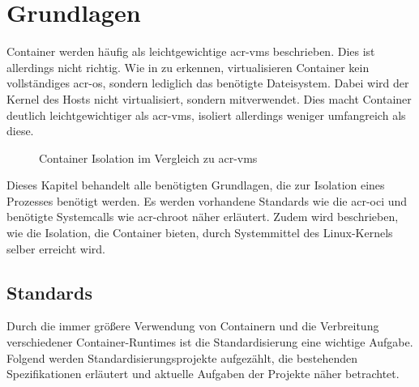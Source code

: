 \chapter{Grundlagen}
\label{chap:grundlagen}
Container werden häufig als leichtgewichtige \glspl{acr-vm} beschrieben. Dies ist allerdings nicht  richtig. Wie in  zu erkennen, virtualisieren Container kein vollständiges \gls{acr-os}, sondern lediglich das benötigte Dateisystem. Dabei wird der Kernel des Hosts nicht virtualisiert, sondern mitverwendet. Dies macht Container deutlich leichtgewichtiger als \glspl{acr-vm}, isoliert allerdings weniger umfangreich als diese.
\begin{figure}[h]
		\hfill
		\caption{Container Isolation im Vergleich zu \glspl{acr-vm}}
		\label{fig:containerVsVm}
\end{figure}

Dieses Kapitel behandelt alle benötigten Grundlagen, die zur Isolation eines Prozesses benötigt werden. Es werden vorhandene Standards wie die \gls{acr-oci} und benötigte Systemcalls wie \gls{acr-chroot} näher erläutert. Zudem wird beschrieben, wie die Isolation, die Container bieten, durch Systemmittel des Linux-Kernels selber erreicht wird.

\section{Standards}
\label{sec:standards}
Durch die immer größere Verwendung von Containern und die Verbreitung verschiedener Container-Runtimes ist die Standardisierung eine wichtige Aufgabe. Folgend werden Standardisierungsprojekte aufgezählt, die bestehenden Spezifikationen erläutert und aktuelle Aufgaben der Projekte näher betrachtet.
